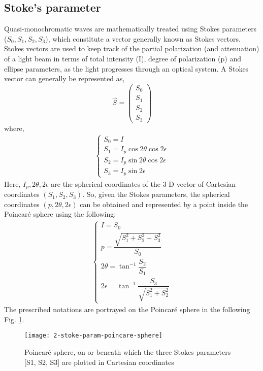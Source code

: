 \documentclass[../report.tex]{subfiles}
\begin{document}
		\subsection{Stoke's parameter} 		
Quasi-monochromatic waves are mathematically treated using Stokes parameters ($S_0,S_1,S_2,S_3$), which constitute a vector generally known as Stokes vectors. Stokes vectors are used to keep track of the partial polarization (and attenuation) of a light beam in terms of total intensity (I), degree of polarization (p) and ellipse parameters, as the light progresses through an optical system. A Stokes vector can generally be represented as,
\begin{equation}\label{eq:stokes_vector}
\overrightarrow {S} = \left(\begin{matrix}  
	S_0 \\
	S_1 \\
	S_2 \\
	S_3
\end{matrix} \right) 
\end{equation}
where,
\begin{equation}\label{eq:stokes_parameters}
\begin{aligned}
\begin{cases}
S_{0}=I\\ 
S_{1}=I_{p}\cos 2\theta \cos 2\epsilon \\
S_{2}=I_{p}\sin 2\theta \cos 2\epsilon \\
S_{3}=I_{p}\sin 2\epsilon
\end{cases}
\end{aligned}
\end{equation}
Here, $I_p, 2\theta, 2\epsilon$ are the spherical coordinates of the 3-D vector of Cartesian coordinates $(S_1,S_2,S_3)$. So, given the Stokes parameters, the spherical coordinates $(p,2\theta,2\epsilon)$ can be obtained and represented by a point inside the Poincaré sphere using the following:
\begin{equation}\label{eq:stokes_spherical_coordinates}
\begin{aligned}
\begin{cases}
I = S_{0}\\ 
p = \dfrac {\sqrt {S_{1}^{2}+S_{2}^{2}+S_{3}^{2}}} {S_{0}} \\
2\theta = \tan^{-1}\dfrac {S_{2}} {S_{1}} \\
2\epsilon = \tan ^{-1}\dfrac {S_{3}} {\sqrt {S_{1}^{2}+S_{2}^{2}}}
\end{cases}
\end{aligned}
\end{equation}
The prescribed notations are portrayed on the Poincaré sphere in the following Fig. \ref{fig:2_stoke_param_poincare_sphere}.    
\begin{figure}[H]
	\centering
	\texttt{[image: 2-stoke-param-poincare-sphere]}
	\caption{Poincaré sphere, on or beneath which the three Stokes parameters [S1, S2, S3] are plotted in Cartesian coordinates \cite{stoke_poincare_parameter}}
	\label{fig:2_stoke_param_poincare_sphere}
\end{figure}
\end{document}
